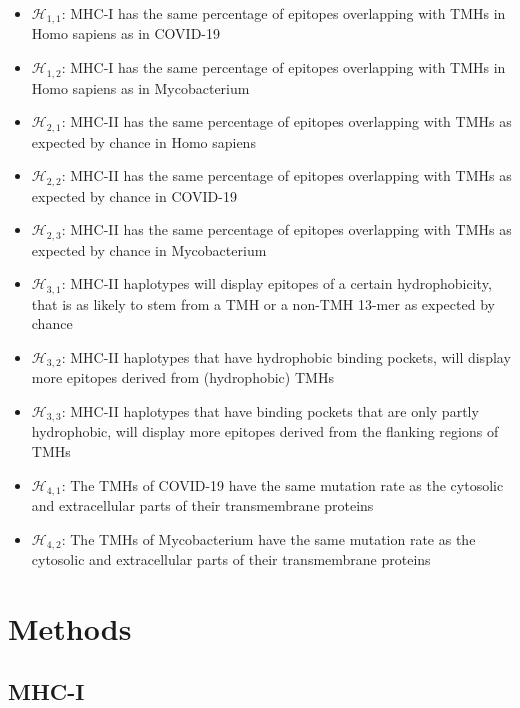 \documentclass{article}
\begin{document}
\begin{itemize}
  \item $\mathcal{H}_{1,1}$: MHC-I has the same percentage of epitopes overlapping
    with TMHs in Homo sapiens as in COVID-19
  \item $\mathcal{H}_{1,2}$: MHC-I has the same percentage of epitopes overlapping
    with TMHs in Homo sapiens as in Mycobacterium
  \item $\mathcal{H}_{2,1}$: MHC-II has the same percentage of epitopes overlapping
    with TMHs as expected by chance in Homo sapiens
  \item $\mathcal{H}_{2,2}$: MHC-II has the same percentage of epitopes overlapping
    with TMHs as expected by chance in COVID-19
  \item $\mathcal{H}_{2,3}$: MHC-II has the same percentage of epitopes overlapping
    with TMHs as expected by chance in Mycobacterium
  \item $\mathcal{H}_{3,1}$: MHC-II haplotypes will display epitopes
    of a certain hydrophobicity, that is as likely to stem from
    a TMH or a non-TMH 13-mer as expected by chance
  \item $\mathcal{H}_{3,2}$: MHC-II haplotypes that have hydrophobic
    binding pockets, will display more epitopes derived from (hydrophobic)
    TMHs
  \item $\mathcal{H}_{3,3}$: MHC-II haplotypes that have binding pockets
    that are only partly hydrophobic, will display more epitopes derived 
    from the flanking regions of TMHs
  \item $\mathcal{H}_{4,1}$: The TMHs of COVID-19
    have the same mutation rate 
    as the cytosolic and extracellular parts of their transmembrane proteins
  \item $\mathcal{H}_{4,2}$: The TMHs of Mycobacterium
    have the same mutation rate 
    as the cytosolic and extracellular parts of their transmembrane proteins
\end{itemize}




\section{Methods}

\subsection{MHC-I}
\end{document}
